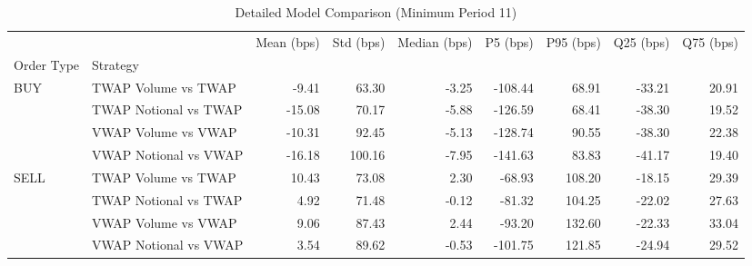 \begin{table}
\caption{Detailed Model Comparison (Minimum Period 11)}
\label{tab:detailed_min_period_11}
\begin{tabular}{l|l|rrrrrrr}
\toprule
 &  & Mean (bps) & Std (bps) & Median (bps) & P5 (bps) & P95 (bps) & Q25 (bps) & Q75 (bps) \\
Order Type & Strategy &  &  &  &  &  &  &  \\
\midrule
\multirow[t]{4}{*}{BUY} & TWAP Volume vs TWAP & -9.41 & 63.30 & -3.25 & -108.44 & 68.91 & -33.21 & 20.91 \\
 & TWAP Notional vs TWAP & -15.08 & 70.17 & -5.88 & -126.59 & 68.41 & -38.30 & 19.52 \\
 & VWAP Volume vs VWAP & -10.31 & 92.45 & -5.13 & -128.74 & 90.55 & -38.30 & 22.38 \\
 & VWAP Notional vs VWAP & -16.18 & 100.16 & -7.95 & -141.63 & 83.83 & -41.17 & 19.40 \\
\cline{1-9}
\multirow[t]{4}{*}{SELL} & TWAP Volume vs TWAP & 10.43 & 73.08 & 2.30 & -68.93 & 108.20 & -18.15 & 29.39 \\
 & TWAP Notional vs TWAP & 4.92 & 71.48 & -0.12 & -81.32 & 104.25 & -22.02 & 27.63 \\
 & VWAP Volume vs VWAP & 9.06 & 87.43 & 2.44 & -93.20 & 132.60 & -22.33 & 33.04 \\
 & VWAP Notional vs VWAP & 3.54 & 89.62 & -0.53 & -101.75 & 121.85 & -24.94 & 29.52 \\
\cline{1-9}
\bottomrule
\end{tabular}
\end{table}
